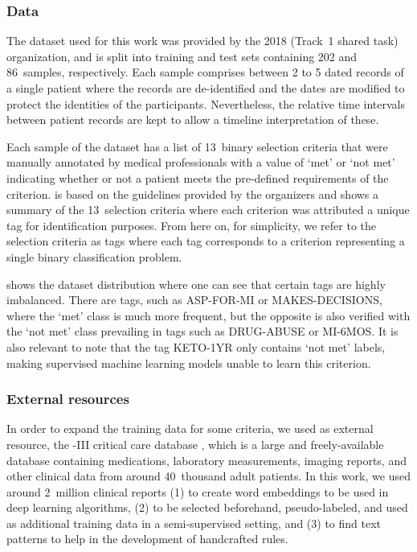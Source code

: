 


\subsubsection{Data}

The dataset used for this work was provided by the 2018  (Track~1 shared task) organization, and is split into training and test sets containing 202 and 86~samples, respectively.
Each sample comprises between 2 to 5 dated records of a single patient where the records are de-identified and the dates are modified to protect the identities of the participants.
Nevertheless, the relative time intervals between patient records are kept to allow a timeline interpretation of these.

Each sample of the dataset has a list of 13~binary selection criteria that were manually annotated by medical professionals with a value of `met' or `not met' indicating whether or not a patient meets the pre-defined requirements of the criterion.
 is based on the guidelines provided by the  organizers and shows a summary of the 13~selection criteria where each criterion was attributed a unique tag for identification purposes.
From here on, for simplicity, we refer to the selection criteria as tags where each tag corresponds to a criterion representing a single binary classification problem.

 shows the dataset distribution where one can see that certain tags are highly imbalanced.
There are tags, such as \textsf{ASP-FOR-MI} or \textsf{MAKES-DECISIONS}, where the `met' class is much more frequent, but the opposite is also verified with the `not met' class prevailing in tags such as \textsf{DRUG-ABUSE} or \textsf{MI-6MOS}.
It is also relevant to note that the tag \textsf{KETO-1YR} only contains `not met' labels, making supervised machine learning models unable to learn this criterion.




\subsubsection{External resources}

In order to expand the training data for some criteria, we used as external resource, the -III critical care database \parencite{johnson2016a}, which is a large and freely-available database containing medications, laboratory measurements, imaging reports, and other clinical data from around 40~thousand adult patients.
In this work, we used around 2~million clinical reports (1) to create word embeddings to be used in deep learning algorithms, (2) to be selected beforehand, pseudo-labeled, and used as additional training data in a semi-supervised setting, and (3) to find text patterns to help in the development of handcrafted rules.

